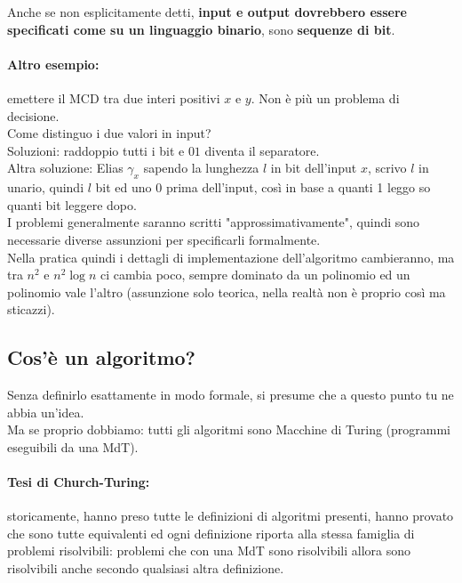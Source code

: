 \documentclass[11pt]{article}
\begin{document}
	Anche se non esplicitamente detti, \textbf{input e output dovrebbero essere specificati come su un linguaggio binario}, sono \textbf{sequenze di bit}.\\
	
	\newpage
	
	\paragraph{Altro esempio:} emettere il MCD tra due interi positivi $x$ e $y$. Non è più un problema di decisione.\\
	
	Come distinguo i due valori in input?  \\
	
	Soluzioni: raddoppio tutti i bit e $01$ diventa il separatore. \\
	
	Altra soluzione: Elias $\gamma_x$ sapendo la lunghezza $l$ in bit dell'input $x$, scrivo $l$ in unario, quindi $l$ bit ed uno $0$ prima dell'input, così in base a quanti 1 leggo so quanti bit leggere dopo.  \\
	
	I problemi generalmente saranno scritti "approssimativamente", quindi sono necessarie diverse assunzioni per specificarli formalmente.\\
	
	Nella pratica quindi i dettagli di implementazione dell'algoritmo cambieranno, ma tra $n^2$ e $n^2 \log n$ ci cambia poco, sempre dominato da un polinomio ed un polinomio vale l'altro (assunzione solo teorica, nella realtà non è proprio così ma sticazzi).
	
	\newpage
	
	\subsection{Cos'è un algoritmo?}
	Senza definirlo esattamente in modo formale, si presume che a questo punto tu ne abbia un'idea.\\
	
	Ma se proprio dobbiamo: tutti gli algoritmi sono Macchine di Turing (programmi eseguibili da una MdT). \\
	
	\paragraph{Tesi di Church-Turing:} storicamente, hanno preso tutte le definizioni di algoritmi presenti, hanno provato che sono tutte equivalenti ed ogni definizione riporta alla stessa famiglia di problemi risolvibili: problemi che con una MdT sono risolvibili allora sono risolvibili anche secondo qualsiasi altra definizione.\\
	
\end{document}
